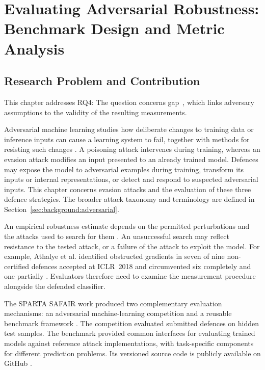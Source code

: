 \chapter{Evaluating Adversarial Robustness: Benchmark Design and Metric Analysis}
\label{chap:advml}

\section{Research Problem and Contribution}
\label{sec:advml:1}

This chapter addresses RQ4: \rqFourText{} The question concerns gap~,
which links adversary assumptions to the validity of the resulting measurements.

Adversarial machine learning studies how deliberate changes to training data or inference
inputs can cause a learning system to fail, together with methods for resisting such changes
\cite{biggio2018wildpatterns}. A poisoning attack intervenes during training, whereas an
evasion attack modifies an input presented to an already trained model. Defences may expose
the model to adversarial examples during training, transform its inputs or internal
representations, or detect and respond to suspected adversarial inputs. This chapter concerns
evasion attacks and the evaluation of these three defence strategies. The broader attack
taxonomy and terminology are defined in Section~\ref{sec:background:adversarial}.

An empirical robustness estimate depends on the permitted perturbations and the attacks used
to search for them \cite{biggio2014security, carlini2019evaluating}. An unsuccessful search
may reflect resistance to the tested attack, or a failure of the attack to exploit the model.
For example, Athalye et al. identified obstructed gradients in seven of nine non-certified
defences accepted at ICLR~2018 and circumvented six completely and one partially
\cite{athalye2018obfuscated}. Evaluators therefore need to examine the measurement procedure
alongside the defended classifier.

The SPARTA SAFAIR work produced two complementary evaluation mechanisms: an adversarial
machine-learning competition and a reusable benchmark framework
\cite{sparta2021d73,sparta2022d76}. The competition evaluated submitted defences on hidden
test samples. The benchmark provided common interfaces for evaluating trained models against
reference attack implementations, with task-specific components for different prediction
problems. Its versioned source code is publicly available on GitHub
\cite{norouzian2021adversarialbenchmark}.

